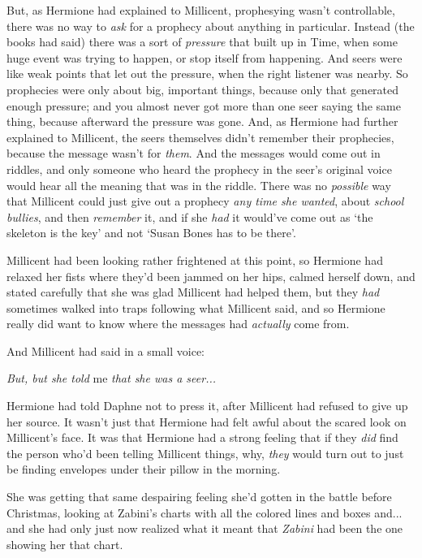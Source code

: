But, as Hermione had explained to Millicent, prophesying wasn't
controllable, there was no way to \emph{ask} for a prophecy about
anything in particular. Instead (the books had said) there was a sort of
\emph{pressure} that built up in Time, when some huge event was trying
to happen, or stop itself from happening. And seers were like weak
points that let out the pressure, when the right listener was nearby. So
prophecies were only about big, important things, because only that
generated enough pressure; and you almost never got more than one seer
saying the same thing, because afterward the pressure was gone. And, as
Hermione had further explained to Millicent, the seers themselves didn't
remember their prophecies, because the message wasn't for \emph{them}.
And the messages would come out in riddles, and only someone who heard
the prophecy in the seer's original voice would hear all the meaning
that was in the riddle. There was no \emph{possible} way that Millicent
could just give out a prophecy \emph{any time she wanted}, about
\emph{school bullies}, and then \emph{remember} it, and if she
\emph{had} it would've come out as `the skeleton is the key' and not
`Susan Bones has to be there'.

Millicent had been looking rather frightened at this point, so Hermione
had relaxed her fists where they'd been jammed on her hips, calmed
herself down, and stated carefully that she was glad Millicent had
helped them, but they \emph{had} sometimes walked into traps following
what Millicent said, and so Hermione really did want to know where the
messages had \emph{actually} come from.

And Millicent had said in a small voice:

\emph{But, but she told} me \emph{that she was a seer...}

Hermione had told Daphne not to press it, after Millicent had refused to
give up her source. It wasn't just that Hermione had felt awful about
the scared look on Millicent's face. It was that Hermione had a strong
feeling that if they \emph{did} find the person who'd been telling
Millicent things, why, \emph{they} would turn out to just be finding
envelopes under their pillow in the morning.

She was getting that same despairing feeling she'd gotten in the battle
before Christmas, looking at Zabini's charts with all the colored lines
and boxes and... and she had only just now realized what it meant
that \emph{Zabini} had been the one showing her that chart.

